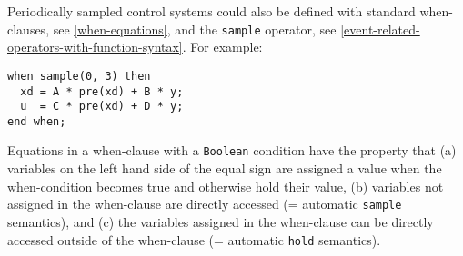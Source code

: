 \begin{nonnormative}
Periodically sampled control systems could also be defined with standard when-clauses, see \cref{when-equations}, and the \lstinline!sample! operator, see \cref{event-related-operators-with-function-syntax}.  For example:
\begin{lstlisting}[language=modelica]
when sample(0, 3) then
  xd = A * pre(xd) + B * y;
  u  = C * pre(xd) + D * y;
end when;
\end{lstlisting}

Equations in a when-clause with a \lstinline!Boolean! condition have the
property that (a) variables on the left hand side of the equal sign are
assigned a value when the when-condition becomes true and otherwise hold
their value, (b) variables not assigned in the when-clause are directly
accessed (= automatic \lstinline!sample! semantics), and (c) the variables
assigned in the when-clause can be directly accessed outside of the
when-clause (= automatic \lstinline!hold! semantics).


\end{nonnormative}
